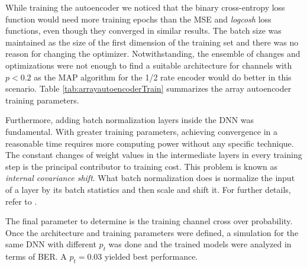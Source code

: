 \documentclass[conference]{IEEEtran}
\begin{document}
While training the autoencoder we noticed that the binary cross-entropy loss function would need more training epochs than the MSE and \textit{logcosh} loss functions, even though they converged in similar results. The batch size was maintained as the size of the first dimension of the training set and there was no reason for changing the optimizer. Notwithstanding, the ensemble of changes and optimizations were not enough to find a suitable architecture for channels with $p<0.2$ as the MAP algorithm for the 1/2 rate encoder would do better in this scenario. Table \ref{tab:arrayautoencoderTrain} summarizes the array autoencoder training parameters.

Furthermore, adding batch normalization layers inside the DNN was fundamental. With greater training parameters, achieving convergence in a reasonable time requires more computing power without any specific technique. The constant changes of weight values in the intermediate layers in every training step is the principal contributor to training cost. This problem is known as \textit{internal covariance shift}. What batch normalization does is normalize the input of a layer by its batch statistics and then scale and shift it. For further details, refer to \cite{DBLP:journals/corr/IoffeS15}.

The final parameter to determine is the training channel cross over probability. Once the architecture and training parameters were defined, a simulation for the same DNN with different $p_t$ was done and the trained models were analyzed in terms of BER. A $p_t=0.03$ yielded best performance.
\end{document}
